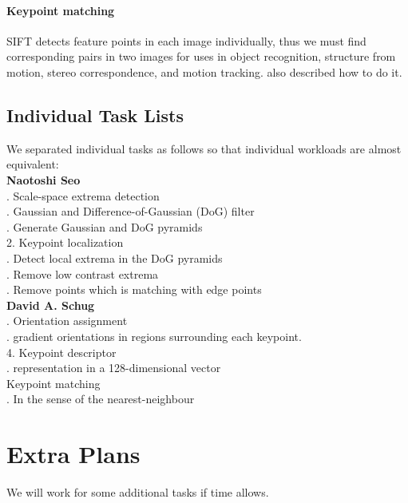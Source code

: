 \documentclass[article,oneside]{memoir}
\begin{document}
\subsubsection{Keypoint matching}

SIFT detects feature points in each image individually, thus we must find corresponding pairs in two images for uses in object recognition, structure from motion, stereo correspondence, and motion tracking. \cite{SIFT} also described how to do it. 

\section{Individual Task Lists}

We separated individual tasks as follows so that individual workloads are almost equivalent:
\\

\noindent \textbf{Naotoshi Seo}\\
. Scale-space extrema detection\\
	. Gaussian and Difference-of-Gaussian (DoG) filter\\
         . Generate Gaussian and DoG pyramids\\
2. Keypoint localization\\
         . Detect local extrema in the DoG pyramids\\
         . Remove low contrast extrema\\
         . Remove points which is matching with edge points\\

\noindent \textbf{David A. Schug}\\
. Orientation assignment\\
. gradient orientations in regions surrounding each keypoint.\\
4. Keypoint descriptor\\
. representation in a 128-dimensional vector\\
Keypoint matching\\
. In the sense of the nearest-neighbour

\chapter{Extra Plans}

We will work for some additional tasks if time allows. 
\end{document}
